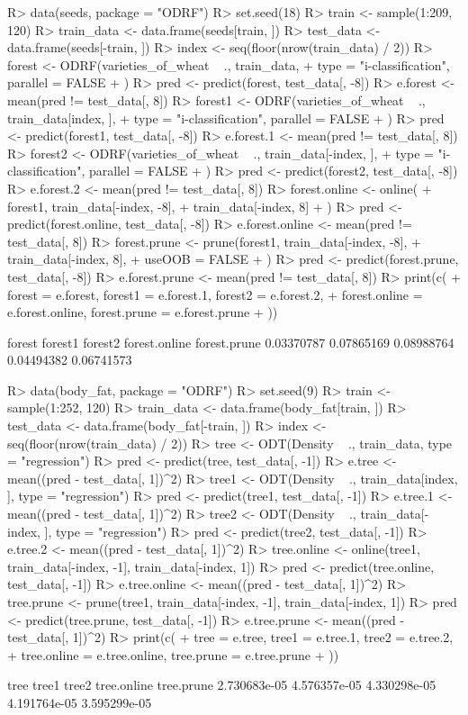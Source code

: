 \documentclass[nojss]{jss}
\numberwithin{equation}{section}
\begin{document}
\begin{Schunk}
\begin{Sinput}
R> data(seeds, package = "ODRF")
R> set.seed(18)
R> train <- sample(1:209, 120)
R> train_data <- data.frame(seeds[train, ])
R> test_data <- data.frame(seeds[-train, ])
R> index <- seq(floor(nrow(train_data) / 2))
R> forest <- ODRF(varieties_of_wheat ~ ., train_data,
+    type = "i-classification", parallel = FALSE
+  )
R> pred <- predict(forest, test_data[, -8])
R> e.forest <- mean(pred != test_data[, 8])
R> forest1 <- ODRF(varieties_of_wheat ~ ., train_data[index, ],
+    type = "i-classification", parallel = FALSE
+  )
R> pred <- predict(forest1, test_data[, -8])
R> e.forest.1 <- mean(pred != test_data[, 8])
R> forest2 <- ODRF(varieties_of_wheat ~ ., train_data[-index, ],
+    type = "i-classification", parallel = FALSE
+  )
R> pred <- predict(forest2, test_data[, -8])
R> e.forest.2 <- mean(pred != test_data[, 8])
R> forest.online <- online(
+    forest1, train_data[-index, -8],
+    train_data[-index, 8]
+  )
R> pred <- predict(forest.online, test_data[, -8])
R> e.forest.online <- mean(pred != test_data[, 8])
R> forest.prune <- prune(forest1, train_data[-index, -8],
+    train_data[-index, 8],
+    useOOB = FALSE
+  )
R> pred <- predict(forest.prune, test_data[, -8])
R> e.forest.prune <- mean(pred != test_data[, 8])
R> print(c(
+    forest = e.forest, forest1 = e.forest.1, forest2 = e.forest.2,
+    forest.online = e.forest.online, forest.prune = e.forest.prune
+  ))
\end{Sinput}
\begin{Soutput}
       forest       forest1       forest2 forest.online  forest.prune 
   0.03370787    0.07865169    0.08988764    0.04494382    0.06741573 
\end{Soutput}
\begin{Sinput}
R> data(body_fat, package = "ODRF")
R> set.seed(9)
R> train <- sample(1:252, 120)
R> train_data <- data.frame(body_fat[train, ])
R> test_data <- data.frame(body_fat[-train, ])
R> index <- seq(floor(nrow(train_data) / 2))
R> tree <- ODT(Density ~ ., train_data, type = "regression")
R> pred <- predict(tree, test_data[, -1])
R> e.tree <- mean((pred - test_data[, 1])^2)
R> tree1 <- ODT(Density ~ ., train_data[index, ], type = "regression")
R> pred <- predict(tree1, test_data[, -1])
R> e.tree.1 <- mean((pred - test_data[, 1])^2)
R> tree2 <- ODT(Density ~ ., train_data[-index, ], type = "regression")
R> pred <- predict(tree2, test_data[, -1])
R> e.tree.2 <- mean((pred - test_data[, 1])^2)
R> tree.online <- online(tree1, train_data[-index, -1], train_data[-index, 1])
R> pred <- predict(tree.online, test_data[, -1])
R> e.tree.online <- mean((pred - test_data[, 1])^2)
R> tree.prune <- prune(tree1, train_data[-index, -1], train_data[-index, 1])
R> pred <- predict(tree.prune, test_data[, -1])
R> e.tree.prune <- mean((pred - test_data[, 1])^2)
R> print(c(
+    tree = e.tree, tree1 = e.tree.1, tree2 = e.tree.2,
+    tree.online = e.tree.online, tree.prune = e.tree.prune
+  ))
\end{Sinput}
\begin{Soutput}
        tree        tree1        tree2  tree.online   tree.prune 
2.730683e-05 4.576357e-05 4.330298e-05 4.191764e-05 3.595299e-05 
\end{Soutput}
\end{Schunk}
\end{document}
